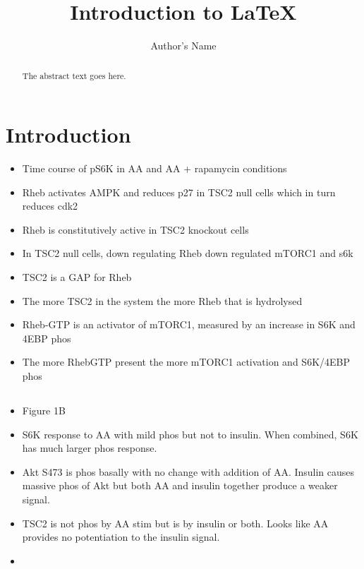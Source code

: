 \documentclass{article}
\begin{document}
\title{Introduction to \LaTeX{}}
\author{Author's Name}

\maketitle

\begin{abstract}
The abstract text goes here.
\end{abstract}

\section{Introduction}

	\begin{itemize}
		\item Time course of pS6K in AA and AA + rapamycin conditions \cite{Patursky-Polischuk2014}
		\item Rheb activates AMPK and reduces p27 in TSC2 null  cells which in turn reduces cdk2 \cite{lacher2010rheb}
		\item Rheb is constitutively active in TSC2 knockout cells \cite{lacher2010rheb}
		\item In TSC2 null cells, down regulating Rheb down regulated mTORC1 and s6k
		\item TSC2 is a GAP for Rheb \cite{Inoki2003}
		\item The more TSC2 in the system the more Rheb that is hydrolysed \cite{Inoki2003}
		\item Rheb-GTP is an activator of mTORC1, measured by an increase in S6K and 4EBP phos
		\item The more RhebGTP present the more mTORC1 activation and S6K/4EBP phos \cite{Inoki2003}
	\end{itemize}

	\subsection{\cite{nobukini2005amino}}
	\begin{itemize}
		\item Figure 1B
		\item S6K response to AA with mild phos but not to insulin. When combined, S6K has much larger phos response.
		\item Akt S473 is phos basally with no change with addition of AA. Insulin causes massive phos of Akt but both AA and insulin together produce a weaker signal.
		\item TSC2 is not phos by AA stim but is by insulin or both. Looks like AA provides no potentiation to the insulin signal.
		\item
	\end{itemize}
\end{document}
